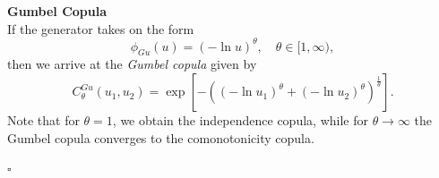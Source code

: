 \textbf{Gumbel Copula}\\
If the generator takes on the form
\begin{equation}
\phi_{G u}(u)=(-\ln u)^{\theta}, \quad \theta \in [1, \infty),
\end{equation}
then we arrive at the \textit{Gumbel copula} given by
\begin{equation}
C_{\theta}^{G u}\left(u_{1}, u_{2}\right)=\exp \left[-\left(\left(-\ln u_{1}\right)^{\theta}+\left(-\ln u_{2}\right)^{\theta}\right)^{\frac{1}{\theta}}\right].
\end{equation}
Note that for $\theta= 1$, we obtain the independence copula, while for $\theta \rightarrow \infty$ the Gumbel copula converges to the comonotonicity copula.

\hfill $\square$ \\





